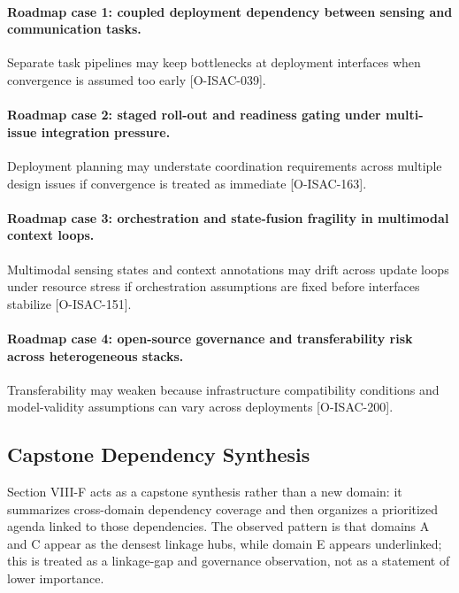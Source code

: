 \paragraph{Roadmap case 1: coupled deployment dependency between sensing and communication tasks.}
Separate task pipelines may keep bottlenecks at deployment interfaces when convergence is assumed too early [O-ISAC-039].

\paragraph{Roadmap case 2: staged roll-out and readiness gating under multi-issue integration pressure.}
Deployment planning may understate coordination requirements across multiple design issues if convergence is treated as immediate [O-ISAC-163].

\paragraph{Roadmap case 3: orchestration and state-fusion fragility in multimodal context loops.}
Multimodal sensing states and context annotations may drift across update loops under resource stress if orchestration assumptions are fixed before interfaces stabilize [O-ISAC-151].

\paragraph{Roadmap case 4: open-source governance and transferability risk across heterogeneous stacks.}
Transferability may weaken because infrastructure compatibility conditions and model-validity assumptions can vary across deployments [O-ISAC-200].

\subsection{Capstone Dependency Synthesis}

Section VIII-F acts as a capstone synthesis rather than a new domain: it summarizes cross-domain dependency coverage and then organizes a prioritized agenda linked to those dependencies. The observed pattern is that domains A and C appear as the densest linkage hubs, while domain E appears underlinked; this is treated as a linkage-gap and governance observation, not as a statement of lower importance.

